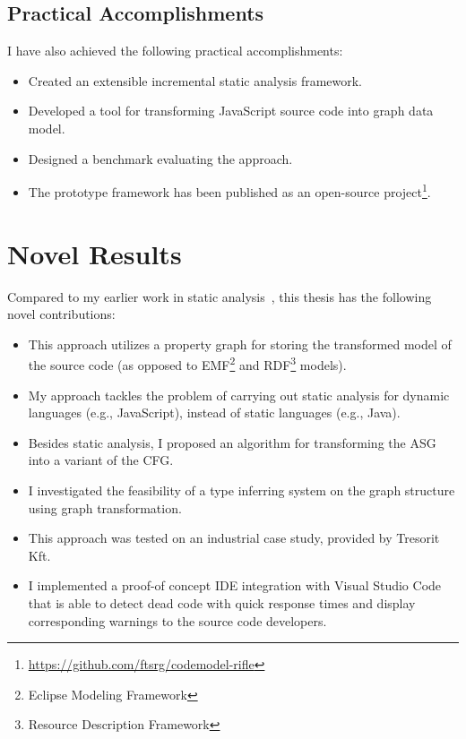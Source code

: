 \subsection{Practical Accomplishments}
I have also achieved the following practical accomplishments:

\begin{itemize}[topsep=0pt]
	\item Created an extensible incremental static analysis framework.
	\item Developed a tool for transforming JavaScript source code into graph data model.
	\item Designed a benchmark evaluating the approach.
	\item The prototype framework has been published as an open-source project\footnote{\small\url{https://github.com/ftsrg/codemodel-rifle}}.
\end{itemize}

\section{Novel Results}
Compared to my earlier work in static analysis~\cite{stein-daniel-tdk,stein-daniel-bsc,stein-daniel-ttc}, this thesis has the following novel contributions:

\begin{itemize}[topsep=0pt]
	\item This approach utilizes a property graph for storing the transformed model of the source code (as opposed to EMF\footnote{Eclipse Modeling Framework} and RDF\footnote{Resource Description Framework} models).

	\item My approach tackles the problem of carrying out static analysis for dynamic languages (e.g., JavaScript), instead of static languages (e.g., Java).

	\item Besides static analysis, I proposed an algorithm for transforming the ASG into a variant of the CFG.

	\item I investigated the feasibility of a type inferring system on the graph structure using graph transformation.

	\item This approach was tested on an industrial case study, provided by Tresorit Kft.

	\item I implemented a proof-of concept IDE integration with Visual Studio Code that is able to detect dead code with quick response times and display corresponding warnings to the source code developers.
\end{itemize}
